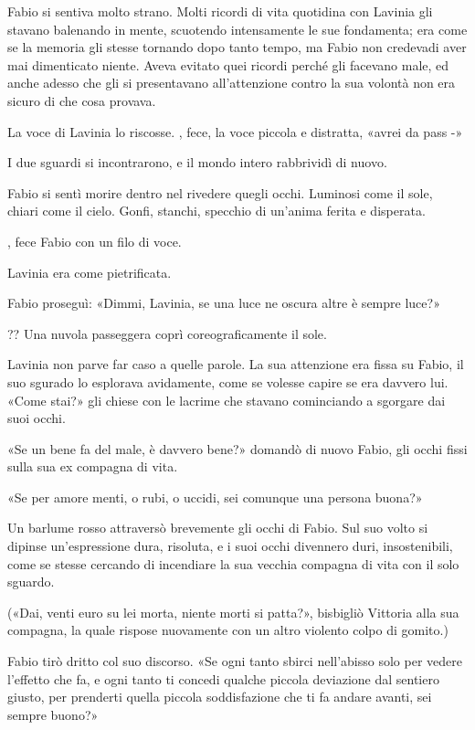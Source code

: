 Fabio si sentiva molto strano. Molti ricordi di vita quotidina con Lavinia gli stavano balenando in mente, scuotendo intensamente le sue fondamenta; era come se la memoria gli stesse tornando dopo tanto tempo, ma Fabio non credevadi aver mai dimenticato niente. Aveva evitato quei ricordi perché gli facevano male, ed anche adesso che gli si presentavano all'attenzione contro la sua volontà non era sicuro di che cosa provava.

La voce di Lavinia lo riscosse. , fece, la voce piccola e distratta, «avrei da pass -»

I due sguardi si incontrarono, e il mondo intero rabbrividì di nuovo.

Fabio si sentì morire dentro nel rivedere quegli occhi. Luminosi come il sole, chiari come il cielo. Gonfi, stanchi, specchio di un'anima ferita e disperata.

, fece Fabio con un filo di voce.

Lavinia era come pietrificata.

Fabio proseguì: «Dimmi, Lavinia, se una luce ne oscura altre è sempre luce?»

?? Una nuvola passeggera coprì coreograficamente il sole.

Lavinia non parve far caso a quelle parole. La sua attenzione era fissa su Fabio, il suo sgurado lo esplorava avidamente, come se volesse capire se era davvero lui. «Come stai?» gli chiese con
le lacrime che stavano cominciando a sgorgare dai suoi occhi. 

«Se un bene fa del male, è davvero bene?» domandò di nuovo Fabio, gli occhi fissi sulla sua ex compagna di vita.

«Se per amore menti, o rubi, o uccidi, sei comunque una persona buona?»

Un barlume rosso attraversò brevemente gli occhi di Fabio. Sul suo volto si dipinse un'espressione dura, risoluta, e i suoi occhi divennero duri, insostenibili, come se stesse cercando di incendiare la sua vecchia compagna di vita con il solo sguardo.

(«Dai, venti euro su lei morta, niente morti si patta?», bisbigliò Vittoria alla sua compagna, la quale rispose nuovamente con un altro violento colpo di gomito.)

Fabio tirò dritto col suo discorso. «Se ogni tanto sbirci nell'abisso solo per vedere l'effetto che fa, e ogni tanto ti concedi qualche piccola deviazione dal sentiero giusto, per prenderti quella piccola soddisfazione che ti fa andare avanti, sei sempre buono?»

